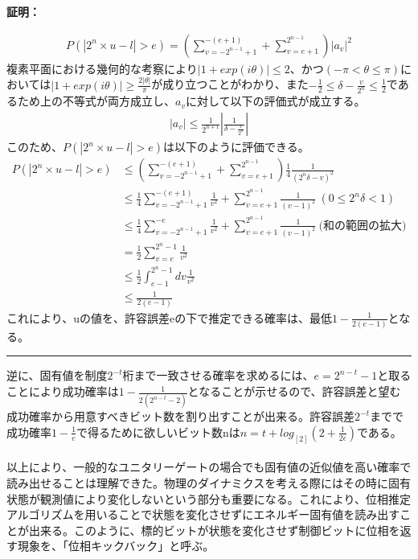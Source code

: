\documentclass[a4paper,10.5pt]{article}
\numberwithin{equation}{section}
\newenvironment{proofbox}
{\begin{prooflabel}\textbf{証明：}\end{prooflabel}\vspace{0.8em}}
{\par\vspace{1em}\hrule\vspace{1em}}
\begin{document}
\begin{proofbox}
\begin{equation}\begin{split}
    P(|2^{n}\times u - l|>e) = (\sum_{v=-2^{n-1}+1}^{-(e+1)} +\sum_{v=e+1}^{2^{n-1}} ) |a_{v}|^{2}
\end{split} \end{equation}
複素平面における幾何的な考察により$|1+exp(i\theta)| \leq 2$、かつ$(-\pi < \theta \leq \pi)$においては$|1+exp(i\theta)|\geq \frac{2|\theta|}{\pi}$が成り立つことがわかり、また$-\frac{1}{2}\leq \delta-\frac{v}{2^{n}} \leq \frac{1}{2}$であるため上の不等式が両方成立し、$a_{v}$に対して以下の評価式が成立する。
\begin{equation}\begin{split}
    |a_{v}| \leq \frac{1}{2^{n+1}} |\frac{1}{\delta-\frac{v}{2^{n}}}|
\end{split} \end{equation}
このため、$P(|2^{n}\times u - l|>e)$は以下のように評価できる。
\begin{equation}\begin{split}
    P(|2^{n}\times u - l|>e) 
    &\leq (\sum_{v=-2^{n-1}+1}^{-(e+1)} +\sum_{v=e+1}^{2^{n-1}} ) 
    \frac{1}{4} \frac{1}{(2^{n}\delta-v)^{2}} \\
    &\leq \frac{1}{4}
    \sum_{v=-2^{n-1}+1}^{-(e+1)} \frac{1}{v^{2}}
    +\sum_{v=e+1}^{2^{n-1}} \frac{1}{(v-1)^{2}}\:(0\leq 2^{n}\delta <1)\\ 
    &\leq \frac{1}{4}
    \sum_{v=-2^{n-1}+1}^{-e} \frac{1}{v^{2}}
    +\sum_{v=e+1}^{2^{n-1}} \frac{1}{(v-1)^{2}} \:\text{(和の範囲の拡大)}\\
    &=\frac{1}{2}\sum_{v=e}^{2^{n}-1} \frac{1}{v^{2}}\\
    &\leq \frac{1}{2} \int_{e-1}^{2^{n}-1} dv \frac{1}{v^{2}}\\
    &\leq \frac{1}{2(e-1)}
\end{split} \end{equation}
これにより、uの値を、許容誤差eの下で推定できる確率は、最低$1-\frac{1}{2(e-1)}$となる。
\end{proofbox}
逆に、固有値を制度$2^{-t}$桁まで一致させる確率を求めるには、$e=2^{n-t}-1$と取ることにより成功確率は$1-\frac{1}{2(2^{n-t}-2)}$となることが示せるので、許容誤差と望む成功確率から用意すべきビット数を割り出すことが出来る。許容誤差$2^{-t}$までで成功確率$1-\frac{1}{e}$で得るために欲しいビット数nは$n=t+log_[2](2+\frac{1}{2\epsilon})$である。\\
\\
以上により、一般的なユニタリーゲートの場合でも固有値の近似値を高い確率で読み出せることは理解できた。物理のダイナミクスを考える際にはその時に固有状態が観測値により変化しないという部分も重要になる。これにより、位相推定アルゴリズムを用いることで状態を変化させずにエネルギー固有値を読み出すことが出来る。このように、標的ビットが状態を変化させず制御ビットに位相を返す現象を、「位相キックバック」と呼ぶ。\\
\end{document}
